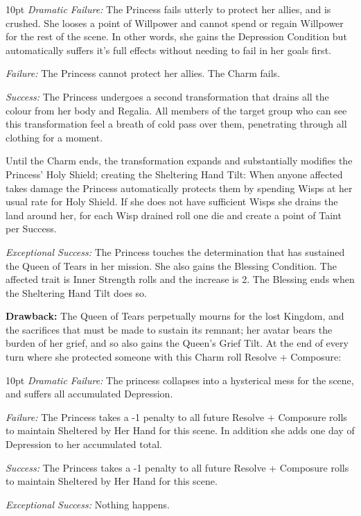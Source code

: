 \begin{myindentpar}{10pt}    \emph{Dramatic Failure:} The Princess fails utterly to protect her allies, and is crushed. She looses a point of Willpower and cannot spend or regain Willpower for the rest of the scene. In other words, she gains the Depression Condition but automatically suffers it's full effects without needing to fail in her goals first. 

    \emph{Failure:} The Princess cannot protect her allies. The Charm fails.

    \emph{Success:} The Princess undergoes a second transformation that drains all the colour from her body and Regalia. All members of the target group who can see this transformation feel a breath of cold pass over them, penetrating through all clothing for a moment. 
    
    Until the Charm ends, the transformation expands and substantially modifies the Princess' Holy Shield; creating the Sheltering Hand Tilt: When anyone affected takes damage the Princess automatically protects them by spending Wisps at her usual rate for Holy Shield. If she does not have sufficient Wisps she drains the land around her, for each Wisp drained roll one die and create a point of Taint per Success. 
    

    \emph{Exceptional Success:} The Princess touches the determination that has sustained the Queen of Tears in her mission. She also gains the Blessing Condition. The affected trait is Inner Strength rolls and the increase is 2. The Blessing ends when the Sheltering Hand Tilt does so.\end{myindentpar}

\noindent \textbf{Drawback:} The Queen of Tears perpetually mourns for the lost Kingdom, and the sacrifices that must be made to sustain its remnant; her avatar bears the burden of her grief, and so also gains the Queen's Grief Tilt. At the end of every turn where she protected someone with this Charm roll Resolve + Composure: 

   \begin{myindentpar}{10pt}   \emph{Dramatic Failure:} The princess collapses into a hysterical mess for the scene, and suffers all accumulated Depression.
    
    \emph{Failure:} The Princess takes a -1 penalty to all future Resolve + Composure rolls to maintain Sheltered by Her Hand for this scene. In addition she adds one day of Depression to her accumulated total. 

    \emph{Success:} The Princess takes a -1 penalty to all future Resolve + Composure rolls to maintain Sheltered by Her Hand for this scene.

    \emph{Exceptional Success:} Nothing happens. \end{myindentpar}

